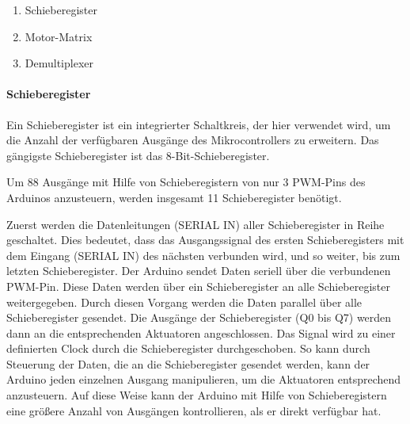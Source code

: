 \begin{enumerate}
	\item Schieberegister
	\item Motor-Matrix
	\item Demultiplexer
\end{enumerate}

\paragraph{Schieberegister}
Ein Schieberegister ist ein integrierter Schaltkreis, der hier verwendet wird, um die Anzahl der verfügbaren Ausgänge des
Mikrocontrollers zu erweitern. Das gängigste Schieberegister ist das 8-Bit-Schieberegister. \newline

Um 88 Ausgänge mit Hilfe von Schieberegistern von nur 3 PWM-Pins des Arduinos anzusteuern, werden insgesamt 11
Schieberegister benötigt.\newline

Zuerst werden die Datenleitungen (SERIAL IN) aller Schieberegister in Reihe geschaltet. Dies bedeutet, dass das
Ausgangssignal des ersten Schieberegisters mit dem Eingang (SERIAL IN) des nächsten verbunden wird, und so weiter, bis
zum letzten Schieberegister. \newline
Der Arduino sendet Daten seriell über die verbundenen PWM-Pin. Diese Daten werden über ein Schieberegister an
alle Schieberegister weitergegeben. Durch diesen Vorgang werden die Daten parallel über alle Schieberegister gesendet.
\newline
Die Ausgänge der Schieberegister (Q0 bis Q7) werden dann an die entsprechenden Aktuatoren angeschlossen.
Das Signal wird zu einer definierten Clock durch die Schieberegister durchgeschoben. So kann durch Steuerung der Daten,
die an die Schieberegister gesendet werden, kann der Arduino jeden einzelnen Ausgang manipulieren, um die Aktuatoren
entsprechend anzusteuern. \newline
Auf diese Weise kann der Arduino mit Hilfe von Schieberegistern eine größere Anzahl von Ausgängen kontrollieren, als er
direkt verfügbar hat.


